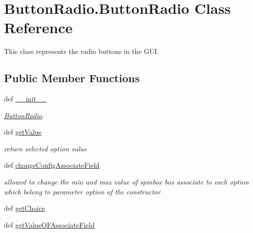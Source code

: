 \hypertarget{classButtonRadio_1_1ButtonRadio}{\section{Button\+Radio.\+Button\+Radio Class Reference}
\label{classButtonRadio_1_1ButtonRadio}
}


This class represents the radio buttons in the G\+U\+I.  


\subsection*{Public Member Functions}
\begin{DoxyCompactItemize}
\item 
def \hyperlink{classButtonRadio_1_1ButtonRadio_adb7eba7bbe00b3ca43bd4de7424f6bbe}{\+\_\+\+\_\+init\+\_\+\+\_\+}
\begin{DoxyCompactList}\small\item\em \hyperlink{classButtonRadio_1_1ButtonRadio}{Button\+Radio}. \end{DoxyCompactList}\item 
\hypertarget{classButtonRadio_1_1ButtonRadio_a24c010e50551a9bc711c25cb039aa444}{def \hyperlink{classButtonRadio_1_1ButtonRadio_a24c010e50551a9bc711c25cb039aa444}{get\+Value}}\label{classButtonRadio_1_1ButtonRadio_a24c010e50551a9bc711c25cb039aa444}

\begin{DoxyCompactList}\small\item\em return selected option value \end{DoxyCompactList}\item 
\hypertarget{classButtonRadio_1_1ButtonRadio_ab1189cfb12e7135ee4fe1394e4637fec}{def \hyperlink{classButtonRadio_1_1ButtonRadio_ab1189cfb12e7135ee4fe1394e4637fec}{change\+Config\+Associate\+Field}}\label{classButtonRadio_1_1ButtonRadio_ab1189cfb12e7135ee4fe1394e4637fec}

\begin{DoxyCompactList}\small\item\em allowed to change the min and max value of spinbox box associate to each option which belong to parameter option of the constructor \end{DoxyCompactList}\item 
def \hyperlink{classButtonRadio_1_1ButtonRadio_ac32284040d2ef137c862c3a24b292f54}{get\+Choice}
\item 
def \hyperlink{classButtonRadio_1_1ButtonRadio_a957e9e0ec8abbdebfdb9a40e66e2f827}{get\+Value\+O\+F\+Associate\+Field}
\end{DoxyCompactItemize}
